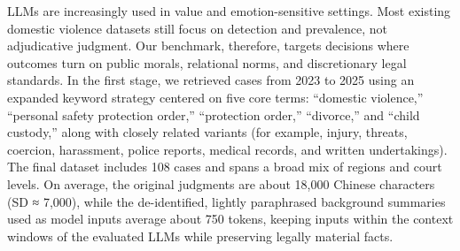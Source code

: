 {{{{{{{LLMs are increasingly used in value and emotion-sensitive settings. Most existing domestic violence datasets still focus on detection and prevalence, not adjudicative judgment. Our benchmark, therefore, targets decisions where outcomes turn on public morals, relational norms, and discretionary legal standards. In the first stage, we retrieved cases from 2023 to 2025 using an expanded keyword strategy centered on five core terms: ``domestic violence,'' ``personal safety protection order,'' ``protection order,'' ``divorce,'' and ``child custody,'' along with closely related variants (for example, injury, threats, coercion, harassment, police reports, medical records, and written undertakings). The final dataset includes 108 cases and spans a broad mix of regions and court levels. On average, the original judgments are about 18,000 Chinese characters (SD ≈ 7,000), while the de-identified, lightly paraphrased background summaries used as model inputs average about 750 tokens, keeping inputs within the context windows of the evaluated LLMs while preserving legally material facts.

}}}}}}}

